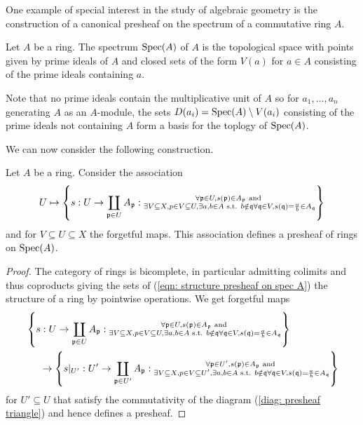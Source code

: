 One example of special interest in the study of algebraic geometry is the construction of a canonical presheaf on the spectrum of a commutative ring $A$. 
\begin{definition}\label{def: spectrum of a ring}
    Let $A$ be a ring. The spectrum $\operatorname{Spec}(A)$ of $A$ is the topological space with points given by prime ideals of $A$ and closed sets of the form $V(a)$ for $a\in A$ consisting of the prime ideals containing $a$. 
\end{definition}
Note that no prime ideals contain the multiplicative unit of $A$ so for $a_{1},\dots,a_{n}$ generating $A$ as an $A$-module, the sets $D(a_{i})=\operatorname{Spec}(A)\setminus V(a_{i})$ consisting of the prime ideals not containing $A$ form a basis for the toplogy of $\operatorname{Spec}(A)$. 

We can now consider the following construction. 
\begin{proposition}\label{prop: structure presheaf on spec A}
    Let $A$ be a ring. Consider the association
    \begin{equation}\label{eqn: structure presheaf on spec A}
        U\mapsto \left\{s:U\to\coprod_{\mathfrak{p}\in U}A_{\mathfrak{p}}:\substack{\forall\mathfrak{p}\in U, s(\mathfrak{p})\in A_{\mathfrak{p}} \text{ and } \\ \exists V\subseteq X, p\in V\subseteq U, \exists a,b\in A \text{ s.t. }b\notin\mathfrak{q} \forall\mathfrak{q}\in V, s(\mathfrak{q})=\frac{a}{b}\in A_{\mathfrak{q}}}\right\}
    \end{equation}
    and for $V\subseteq U\subseteq X$ the forgetful maps. This association defines a presheaf of rings on $\operatorname{Spec}(A)$.
\end{proposition}
\begin{proof}
    The category of rings is bicomplete, in particular admitting colimits and thus coproducts giving the sets of (\ref{eqn: structure presheaf on spec A}) the structure of a ring by pointwise operations. We get forgetful maps 
    \begin{align*}
        &\left\{s:U\to\coprod_{\mathfrak{p}\in U}A_{\mathfrak{p}}:\substack{\forall\mathfrak{p}\in U, s(\mathfrak{p})\in A_{\mathfrak{p}} \text{ and } \\ \exists V\subseteq X, p\in V\subseteq U, \exists a,b\in A \text{ s.t. }b\notin\mathfrak{q} \forall\mathfrak{q}\in V, s(\mathfrak{q})=\frac{a}{b}\in A_{\mathfrak{q}}}\right\} \\
        &\hspace{0.5cm}\to\left\{s|_{U'}:U'\to\coprod_{\mathfrak{p}\in U'}A_{\mathfrak{p}}:\substack{\forall\mathfrak{p}\in U', s(\mathfrak{p})\in A_{\mathfrak{p}} \text{ and } \\ \exists V\subseteq X, p\in V\subseteq U', \exists a,b\in A \text{ s.t. }b\notin\mathfrak{q} \forall\mathfrak{q}\in V, s(\mathfrak{q})=\frac{a}{b}\in A_{\mathfrak{q}}}\right\}
    \end{align*}
    for $U'\subseteq U$ that satisfy the commutativity of the diagram (\ref{diag: presheaf triangle}) and hence defines a presheaf. 
\end{proof}
